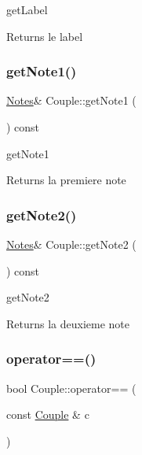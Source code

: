 get\+Label 

\begin{DoxyReturn}{Returns}
le label 
\end{DoxyReturn}
\mbox{\label{class_couple_acd88fe5ee43929a72a95c6c5129e6fbd}} 
\subsubsection{\texorpdfstring{get\+Note1()}{getNote1()}}
{\footnotesize\ttfamily \hyperlink{class_notes}{Notes}\& Couple\+::get\+Note1 (\begin{DoxyParamCaption}{ }\end{DoxyParamCaption}) const\hspace{0.3cm}{\ttfamily [inline]}}



get\+Note1 

\begin{DoxyReturn}{Returns}
la premiere note 
\end{DoxyReturn}
\mbox{\label{class_couple_a8e9f87f1c450bf8c21514a04b7734c45}} 
\subsubsection{\texorpdfstring{get\+Note2()}{getNote2()}}
{\footnotesize\ttfamily \hyperlink{class_notes}{Notes}\& Couple\+::get\+Note2 (\begin{DoxyParamCaption}{ }\end{DoxyParamCaption}) const\hspace{0.3cm}{\ttfamily [inline]}}



get\+Note2 

\begin{DoxyReturn}{Returns}
la deuxieme note 
\end{DoxyReturn}
\mbox{\label{class_couple_a493af8c8763ceef4cadf82787a3ccf47}} 
\subsubsection{\texorpdfstring{operator==()}{operator==()}}
{\footnotesize\ttfamily bool Couple\+::operator== (\begin{DoxyParamCaption}\item[{const \hyperlink{class_couple}{Couple} \&}]{c }\end{DoxyParamCaption})}



